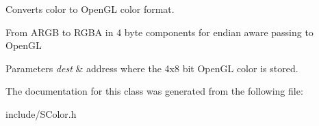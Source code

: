 Converts color to Open\+GL color format. 

From A\+R\+GB to R\+G\+BA in 4 byte components for endian aware passing to Open\+GL 
\begin{DoxyParams}{Parameters}
{\em dest} & address where the 4x8 bit Open\+GL color is stored. \\
\hline
\end{DoxyParams}


The documentation for this class was generated from the following file\+:\begin{DoxyCompactItemize}
\item 
include/S\+Color.\+h\end{DoxyCompactItemize}
